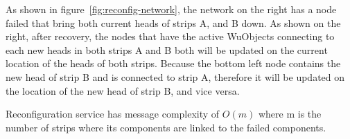 As shown in figure~\ref{fig:reconfig-network}, the network on the right has
a node failed that bring both current heads of strips A, and B down. As shown
on the right, after recovery, the nodes that have the active WuObjects
connecting to each new heads in both strips A and B both will be updated on the
current location of the heads of both strips. Because the bottom left node
contains the new head of strip B and is connected to strip A, therefore it will
be updated on the location of the new head of strip B, and vice versa.

Reconfiguration service has message complexity of $O(m)$ where m is the
number of strips where its components are linked to the failed components.

 %

